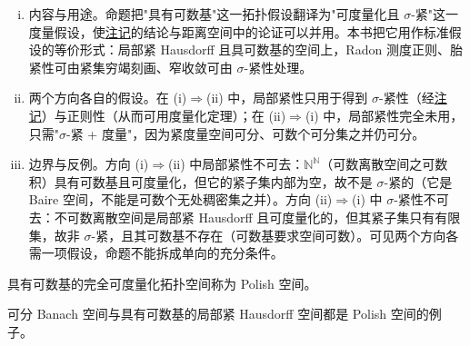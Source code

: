 \documentclass[../main.tex]{subfiles}
\begin{document}
\begin{remark}\label{remark:appA-局部紧基}
\begin{enumerate}[(i)]
\item 内容与用途。命题把"具有可数基"这一拓扑假设翻译为"可度量化且 $\sigma$-紧"这一度量假设，使\hyperref[remark:appA-可数基局部紧]{注记}的结论与距离空间中的论证可以并用。本书把它用作标准假设的等价形式：局部紧 Hausdorff 且具可数基的空间上，Radon 测度正则、胎紧性可由紧集穷竭刻画、窄收敛可由 $\sigma$-紧性处理。
\item 两个方向各自的假设。在 (i)$\Rightarrow$(ii) 中，局部紧性只用于得到 $\sigma$-紧性（经\hyperref[remark:appA-可数基局部紧]{注记}）与正则性（从而可用度量化定理）；在 (ii)$\Rightarrow$(i) 中，局部紧性完全未用，只需"$\sigma$-紧 + 度量"，因为紧度量空间可分、可数个可分集之并仍可分。
\item 边界与反例。方向 (i)$\Rightarrow$(ii) 中局部紧性不可去：$\mathbb{N}^{\mathbb{N}}$（可数离散空间之可数积）具有可数基且可度量化，但它的紧子集内部为空，故不是 $\sigma$-紧的（它是 Baire 空间，不能是可数个无处稠密集之并）。方向 (ii)$\Rightarrow$(i) 中 $\sigma$-紧性不可去：不可数离散空间是局部紧 Hausdorff 且可度量化的，但其紧子集只有有限集，故非 $\sigma$-紧，且其可数基不存在（可数基要求空间可数）。可见两个方向各需一项假设，命题不能拆成单向的充分条件。
\end{enumerate}
\end{remark}

\begin{definition}[Polish 空间]\label{definition:appA-Polish}
具有可数基的完全可度量化拓扑空间称为 Polish 空间。
\end{definition}

可分 Banach 空间与具有可数基的局部紧 Hausdorff 空间都是 Polish 空间的例子。
\end{document}
